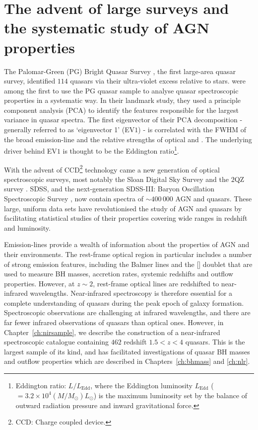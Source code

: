 \section{The advent of large surveys and the systematic study of AGN properties}

The Palomar-Green (PG) Bright Quasar Survey \citep[BQS;][]{schmidt83}, the first large-area quasar survey, identified $114$ quasars via their ultra-violet excess relative to stars. 
\citet{boroson92} were among the first to use the PG quasar sample to analyse quasar spectroscopic properties in a systematic way. 
In their landmark study, they used a principle component analysis (PCA) to identify the features responsible for the largest variance in quasar spectra. 
The first eigenvector of their PCA decomposition - generally referred to as `eigenvector 1' (EV$1$) - is correlated with the FWHM of the broad \hb emission-line and the relative strengths of optical  and \hbns. 
The underlying driver behind EV$1$ is thought to be the Eddington ratio\footnote{Eddington ratio: $L/L_{\text{Edd}}$, where the Eddington luminosity $L_{\text{Edd}}$ ($=3.2\times10^4(M/M_\odot)L_\odot$) is the maximum luminosity set by the balance of outward radiation pressure and inward gravitational force.}. 

With the advent of CCD\footnote{CCD: Charge coupled device.} technology came a new generation of optical spectroscopic surveys, most notably the Sloan Digital Sky Survey \citep[SDSS;][]{york00} and the $2$QZ survey \citep{croom04}. 
SDSS, and the next-generation SDSS-III: Baryon Oscillation Spectroscopic Survey \citep[BOSS;][]{dawson13}, now contain spectra of $\sim400\,000$ AGN and quasars. 
These large, uniform data sets have revolutionised the study of AGN and quasars by facilitating statistical studies of their properties covering wide ranges in redshift and luminosity.

Emission-lines provide a wealth of information about the properties of AGN and their environments. 
The rest-frame optical region in particular includes a number of strong emission features, including the Balmer lines and the [] doublet that are used to measure BH masses, accretion rates, systemic redshifts and outflow properties. 
However, at $z\sim2$, rest-frame optical lines are redshifted to near-infrared wavelengths. 
Near-infrared spectroscopy is therefore essential for a complete understanding of quasars during the peak epoch of galaxy formation. 
Spectroscopic observations are challenging at infrared wavelengths, and there are far fewer infrared observations of quasars than optical ones. 
However, in Chapter~\ref{ch:nirsample}, we describe the construction of a near-infrared spectroscopic catalogue containing $462$ redshift $1.5 < z < 4$ quasars. 
This is the largest sample of its kind, and has facilitated investigations of quasar BH masses and outflow properties which are described in Chapters~\ref{ch:bhmass} and \ref{ch:nlr}.   

